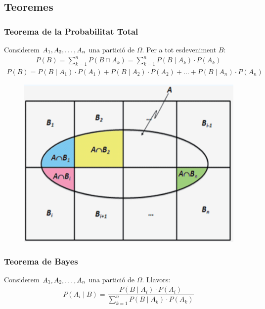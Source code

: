 \documentclass{article}
\begin{document}
\subsection{Teoremes}

\subsubsection{Teorema de la Probabilitat Total} \label{eqn:ptotal}

Considerem $A_1,\space A_2,\ldots,\space A_n$ una partició de $\Omega$. Per a tot esdeveniment $B:$
\begin{align*}
P(B) = \sum_{k=1}^{n} P(B\cap A_k) = \sum_{k=1}^{n} P(B\mid A_k)\cdot  P(A_k)
\end{align*}
\begin{align*}
P(B) = P(B\mid A_1)\cdot P(A_1) + P(B\mid A_2)\cdot P(A_2) + \ldots + P(B\mid A_n)\cdot P(A_n)
\end{align*}

\begin{figure}[H]
    \includegraphics[scale=0.6]{pictures/image4.png}
    \centering
\end{figure}

\subsubsection{Teorema de Bayes}\label{eqn:bayes}

Considerem $A_1,\space A_2,\ldots,\space A_n$ una partició de $\Omega$. Llavors:
\begin{align*}
P(A_i\mid B) = \dfrac{P(B \mid A_i) \cdot P(A_i)}{\displaystyle\sum_{k=1}^{n} P(B\mid A_k)\cdot P(A_k)}
\end{align*}
\end{document}
